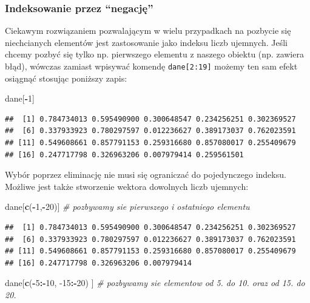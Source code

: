 \documentclass[]{book}
\newenvironment{Shaded}{\begin{snugshade}}{\end{snugshade}}
\newcommand{\KeywordTok}[1]{\textcolor[rgb]{0.13,0.29,0.53}{\textbf{#1}}}
\newcommand{\DecValTok}[1]{\textcolor[rgb]{0.00,0.00,0.81}{#1}}
\newcommand{\CommentTok}[1]{\textcolor[rgb]{0.56,0.35,0.01}{\textit{#1}}}
\newcommand{\OperatorTok}[1]{\textcolor[rgb]{0.81,0.36,0.00}{\textbf{#1}}}
\newcommand{\NormalTok}[1]{#1}
\theoremstyle{definition}
\theoremstyle{definition}
\theoremstyle{definition}
\theoremstyle{remark}
\begin{document}
\subsubsection{\texorpdfstring{Indeksowanie przez
``negację''}{Indeksowanie przez negację}}\label{indeksowanie-przez-negacje}

Ciekawym rozwiązaniem pozwalającym w wielu przypadkach na pozbycie się
niechcianych elementów jest zastosowanie jako indeksu liczb ujemnych.
Jeśli chcemy pozbyć się tylko np. pierwszego elementu z naszego obiektu
(np. zawiera błąd), wówczas zamiast wpisywać komendę
\texttt{dane{[}2:19{]}} możemy ten sam efekt osiągnąć stosując poniższy
zapis:

\begin{Shaded}
\begin{Highlighting}[]
\NormalTok{dane[}\OperatorTok{-}\DecValTok{1}\NormalTok{]}
\end{Highlighting}
\end{Shaded}

\begin{verbatim}
##  [1] 0.784734013 0.595490900 0.300648547 0.234256251 0.302369527
##  [6] 0.337933923 0.780297597 0.012236627 0.389173037 0.762023591
## [11] 0.549608661 0.857791153 0.259316680 0.857080017 0.255409679
## [16] 0.247717798 0.326963206 0.007979414 0.259561501
\end{verbatim}

Wybór poprzez eliminację nie musi się ograniczać do pojedynczego
indeksu. Możliwe jest także stworzenie wektora dowolnych liczb ujemnych:

\begin{Shaded}
\begin{Highlighting}[]
\NormalTok{dane[}\KeywordTok{c}\NormalTok{(}\OperatorTok{-}\DecValTok{1}\NormalTok{,}\OperatorTok{-}\DecValTok{20}\NormalTok{)] }\CommentTok{# pozbywamy sie pierwszego i ostatniego elementu}
\end{Highlighting}
\end{Shaded}

\begin{verbatim}
##  [1] 0.784734013 0.595490900 0.300648547 0.234256251 0.302369527
##  [6] 0.337933923 0.780297597 0.012236627 0.389173037 0.762023591
## [11] 0.549608661 0.857791153 0.259316680 0.857080017 0.255409679
## [16] 0.247717798 0.326963206 0.007979414
\end{verbatim}

\begin{Shaded}
\begin{Highlighting}[]
\NormalTok{dane[}\KeywordTok{c}\NormalTok{(}\OperatorTok{-}\DecValTok{5}\OperatorTok{:-}\DecValTok{10}\NormalTok{, }\DecValTok{-15}\OperatorTok{:-}\DecValTok{20}\NormalTok{) ] }\CommentTok{# pozbywamy sie elementow od 5. do 10. oraz od 15. do 20.}
\end{Highlighting}
\end{Shaded}
\end{document}
